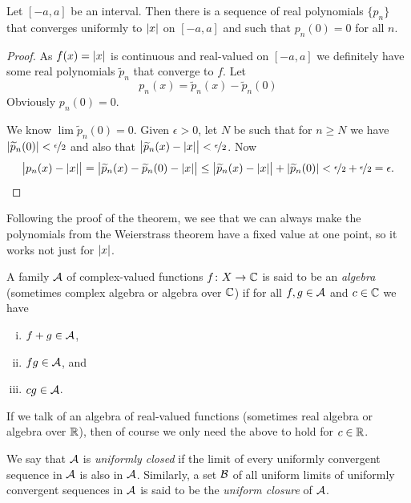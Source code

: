 \begin{cor}
Let $[-a,a]$ be an interval.  Then there is a sequence of real polynomials
$\{ p_n \}$ that converges uniformly to $\lvert {x} \rvert$ on $[-a,a]$ and such that
$p_n(0) = 0$ for all $n$.
\end{cor}

\begin{proof}
As $f(x) = \lvert {x} \rvert$ is continuous and real-valued
on $[-a,a]$ we definitely have some
real polynomials $\widetilde{p}_n$ that converge to $f$.
Let
\begin{equation*}
p_n(x) = \widetilde{p}_n(x) - \widetilde{p}_n(0)
\end{equation*}
Obviously $p_n(0) = 0$.

We know
$\lim \widetilde{p}_n(0) = 0$.  Given $\epsilon > 0$, let $N$ be such that
for $n \geq N$ we have $\lvert {\widetilde{p}_n(0)} \rvert < \nicefrac{\epsilon}{2}$
and also that $\bigl\lvert\widetilde{p}_n(x)-\lvert {x} \rvert\big\rvert < \nicefrac{\epsilon}{2}$.
Now
\begin{equation*}
\bigl\lvert p_n(x)-\lvert {x} \rvert \bigr\rvert
=
\bigl\lvert \widetilde{p}_n(x) - \widetilde{p}_n(0) - \lvert {x} \rvert \bigr\rvert
\leq
\bigl\lvert \widetilde{p}_n(x) - \lvert {x} \rvert \bigr\rvert + \lvert {\widetilde{p}_n(0)} \rvert < 
\nicefrac{\epsilon}{2} + \nicefrac{\epsilon}{2} = \epsilon . \qedhere
\end{equation*}
\end{proof}

Following the proof of the theorem,
we see that we can always make the polynomials from the Weierstrass theorem
have a fixed value at one point, so it works not just for $\lvert {x} \rvert$.

\begin{defn}
A family ${\mathcal{A}}$ of complex-valued functions $f \colon X \to {\mathbb{C}}$ is said to be an 
\emph{algebra} (sometimes complex algebra or algebra over ${\mathbb{C}}$) if for all $f, g \in {\mathcal{A}}$ and $c \in {\mathbb{C}}$ we have
\begin{enumerate}[(i)]
\item $f+g \in {\mathcal{A}}$,
\item $fg \in {\mathcal{A}}$, and
\item $cg \in {\mathcal{A}}$.
\end{enumerate}

If we talk of an algebra of real-valued functions
(sometimes real algebra or algebra over ${\mathbb{R}}$), then of course we only
need the above to hold for $c \in {\mathbb{R}}$.

We say that ${\mathcal{A}}$ is \emph{uniformly closed} if the limit of every uniformly
convergent sequence in ${\mathcal{A}}$ is also in ${\mathcal{A}}$.
Similarly, a set ${\mathcal{B}}$ of all uniform limits of uniformly convergent
sequences in ${\mathcal{A}}$ is said to be the \emph{uniform closure} of ${\mathcal{A}}$.
\end{defn}

